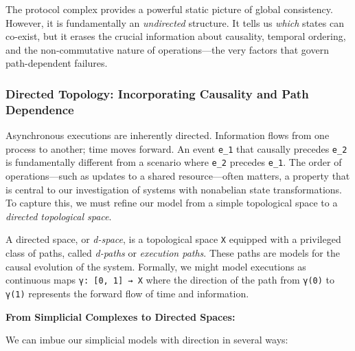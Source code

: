 \documentclass[
]{article}
\begin{document}
The protocol complex provides a powerful static picture of global
consistency. However, it is fundamentally an \emph{undirected}
structure. It tells us \emph{which} states can co-exist, but it erases
the crucial information about causality, temporal ordering, and the
non-commutative nature of operations---the very factors that govern
path-dependent failures.

\subsubsection{\texorpdfstring{\textbf{Directed Topology: Incorporating
Causality and Path
Dependence}}{Directed Topology: Incorporating Causality and Path Dependence}}\label{directed-topology-incorporating-causality-and-path-dependence}

Asynchronous executions are inherently directed. Information flows from
one process to another; time moves forward. An event \texttt{e\_1} that
causally precedes \texttt{e\_2} is fundamentally different from a
scenario where \texttt{e\_2} precedes \texttt{e\_1}. The order of
operations---such as updates to a shared resource---often matters, a
property that is central to our investigation of systems with nonabelian
state transformations. To capture this, we must refine our model from a
simple topological space to a \emph{directed topological space}.

A directed space, or \emph{d-space}, is a topological space \texttt{X}
equipped with a privileged class of paths, called \emph{d-paths} or
\emph{execution paths}. These paths are models for the causal evolution
of the system. Formally, we might model executions as continuous maps
\texttt{γ:\ {[}0,\ 1{]}\ →\ X} where the direction of the path from
\texttt{γ(0)} to \texttt{γ(1)} represents the forward flow of time and
information.

\textbf{From Simplicial Complexes to Directed Spaces:}

We can imbue our simplicial models with direction in several ways:
\end{document}
